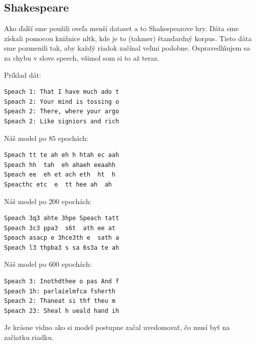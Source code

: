 \documentclass[10pt,a4paper]{article}
\begin{document}
\subsection{Shakespeare}
Ako ďalší sme použili oveľa menší dataset a to Shakespearove hry. 
Dáta sme získali pomocou knižnice nltk, kde je to (takmer) štandardný korpus.
Tieto dáta sme pozmenili tak, aby každý riadok začínal veľmi podobne. 
Ospravedlňujem sa za chybu v slove speech, všimol som si to až teraz.

Príklad dát:
\begin{verbatim}
Speach 1: That I have much ado t
Speach 2: Your mind is tossing o
Speach 2: There, where your argo
Speach 2: Like signiors and rich
\end{verbatim}


Náš model po $85$ epochách:
\begin{verbatim}
Speach tt te ah eh h htah ec aah
Speach hh  tah  eh ahaeh eeaahh 
Speach ee  eh et ach eth  ht  h 
Speacthc etc  e  tt hee ah  ah  
\end{verbatim}

Náš model po $200$ epochách:
\begin{verbatim}
Speach 3q3 ahte 3hpe Speach tatt
Speach 3c3 ppa3  s6t  ath ee at 
Speach asacp e 3hce3th e  sath a
Speach l3 thpba3 s sa 6s3a te ah
\end{verbatim}

Náš model po $600$ epochách:
\begin{verbatim}
Speach 3: Inothdthee o pas And f
Speach 1h: parlaielmfca fsherth 
Speach 2: Thaneat si thf theu m 
Speach 23: Sheal h ueald hand ih
\end{verbatim}

Je krásne vidno ako si model postupne začal uvedomovať, čo musí byť na začiatku riadku.
\end{document}
